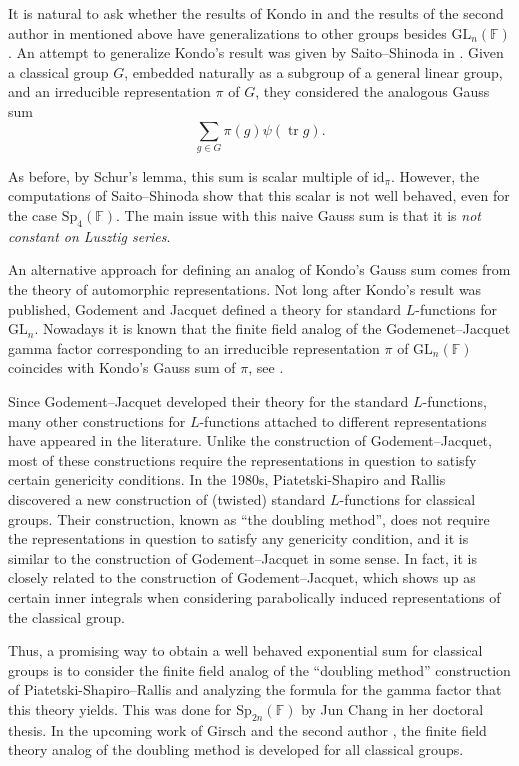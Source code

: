 \documentclass[12pt, reqno]{amsart}
\theoremstyle{definition}
\theoremstyle{definition}
\theoremstyle{definition}
\newcommand{\idmap}{\mathrm{id}}
\newcommand{\fieldCharacter}{\psi}
\newcommand{\trace}{\operatorname{tr}}
\newcommand{\GL}{\mathrm{GL}}
\newcommand{\Sp}{\mathrm{Sp}}
\newcommand{\finiteField}{\mathbb{F}}
\begin{document}
It is natural to ask whether the results of Kondo in \cite{Kondo1963} and the results of the second author in \cite{Zelingher2024} mentioned above have generalizations to other groups besides $\GL_n\left(\finiteField\right)$. An attempt to generalize Kondo's result was given by Saito--Shinoda in \cite{SaitoShinoda2000}. Given a classical group $G$, embedded naturally as a subgroup of a general linear group, and an irreducible representation $\pi$ of $G$, they considered the analogous Gauss sum
$$\sum_{g \in G} \pi\left(g\right) \fieldCharacter\left(\trace g\right).$$

As before, by Schur's lemma, this sum is scalar multiple of $\idmap_{\pi}$. However, the computations of Saito--Shinoda show that this scalar is not well behaved, even for the case $\Sp_{4}\left(\finiteField\right)$. The main issue with this naive Gauss sum is that it is \emph{not constant on Lusztig series}.

An alternative approach for defining an analog of Kondo's Gauss sum comes from the theory of automorphic representations. Not long after Kondo's result was published, Godement and Jacquet \cite{GodementJacquet1972} defined a theory for standard $L$-functions for $\GL_n$. Nowadays it is known that the finite field analog of the Godemenet--Jacquet gamma factor corresponding to an irreducible representation $\pi$ of $\GL_n\left(\finiteField\right)$ coincides with Kondo's Gauss sum of $\pi$, see \cite[Section 2]{Macdonald80}.

Since Godement--Jacquet developed their theory for the standard $L$-functions, many other constructions for $L$-functions attached to different representations have appeared in the literature. Unlike the construction of Godement--Jacquet, most of these constructions require the representations in question to satisfy certain genericity conditions. In the 1980s, Piatetski-Shapiro and Rallis \cite{PiatetskiShapiroRallis1986, GelbartPiatetskiShapiroRallis1987} discovered a new construction of (twisted) standard $L$-functions for classical groups. Their construction, known as ``the doubling method'', does not require the representations in question to satisfy any genericity condition, and it is similar to the construction of Godement--Jacquet in some sense. In fact, it is closely related to the construction of Godement--Jacquet, which shows up as certain inner integrals when considering parabolically induced representations of the classical group.

Thus, a promising way to obtain a well behaved exponential sum for classical groups is to consider the finite field analog of the ``doubling method'' construction of Piatetski-Shapiro--Rallis and analyzing the formula for the gamma factor that this theory yields. This was done for $\Sp_{2n}\left(\finiteField\right)$ by Jun Chang \cite{Chang1997} in her doctoral thesis. In the upcoming work of Girsch and the second author \cite{GirschZelingher2025}, the finite field theory analog of the doubling method is developed for all classical groups.
\end{document}
